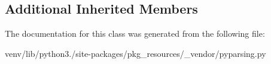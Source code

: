 \subsection*{Additional Inherited Members}


The documentation for this class was generated from the following file\+:\begin{DoxyCompactItemize}
\item 
venv/lib/python3./site-\/packages/pkg\+\_\+resources/\+\_\+vendor/pyparsing.\+py\end{DoxyCompactItemize}

